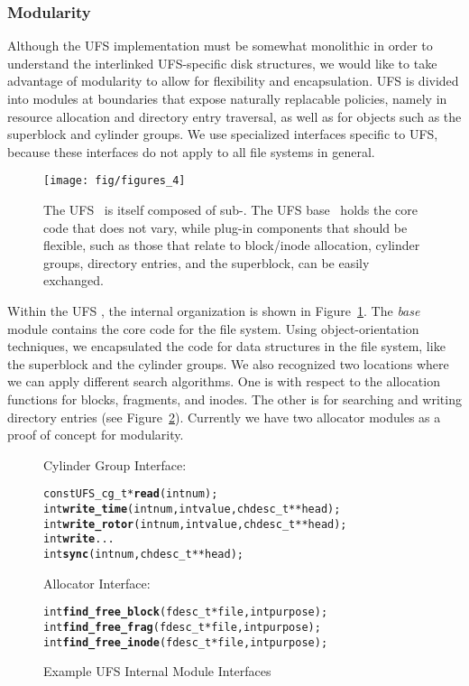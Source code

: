 \subsubsection {Modularity}
Although the UFS implementation must be somewhat monolithic in order to
understand the interlinked UFS-specific disk structures, we would like to take
advantage of modularity to allow for flexibility and encapsulation. UFS is
divided into modules at boundaries that expose naturally replacable policies,
namely in resource allocation and directory entry traversal, as well as for
objects such as the superblock and cylinder groups. We use specialized
interfaces specific to UFS, because these interfaces do not apply to all file
systems in general.

\begin{figure}[htb]
  \centering
  \texttt{[image: fig/figures\_4]}
  \caption{\label{fig:ufsmodules} The UFS \module\ is itself composed of
  sub-\modules. The UFS base \module\ holds the core code that does not
  vary, while plug-in components that should be flexible, such as those that
  relate to block/inode allocation, cylinder groups, directory entries, and the
  superblock, can be easily exchanged.}
\end{figure}

Within the UFS \module, the internal organization is shown in
Figure~\ref{fig:ufsmodules}. The \emph{base} module contains the core code for
the file system. Using object-orientation techniques, we encapsulated the code
for data structures in the file system, like the superblock and the cylinder
groups. We also recognized two locations where we can apply different search
algorithms. One is with respect to the allocation functions for blocks,
fragments, and inodes. The other is for searching and writing directory entries
(see Figure~\ref{fig:moduleinterface}). Currently we have two allocator modules
as a proof of concept for modularity.

\begin{figure}[htb]
Cylinder Group Interface:
\vspace{-0.5\baselineskip}
\begin{scriptsize}
\begin{alltt}
const UFS_cg_t * \textbf{read}(int num);
int \textbf{write_time}(int num, int value, chdesc_t ** head);
int \textbf{write_rotor}(int num, int value, chdesc_t ** head);
int \textbf{write}...
int \textbf{sync}(int num, chdesc_t ** head);
\end{alltt}
\end{scriptsize}

Allocator Interface:
\vspace{-0.5\baselineskip}
\begin{scriptsize}
\begin{alltt}
int \textbf{find_free_block}(fdesc_t * file, int purpose);
int \textbf{find_free_frag}(fdesc_t * file, int purpose);
int \textbf{find_free_inode}(fdesc_t * file, int purpose);
\end{alltt}
\end{scriptsize}
\vspace{-0.5\baselineskip}
\caption{\label{fig:moduleinterface} Example UFS Internal Module Interfaces}
\end{figure}

